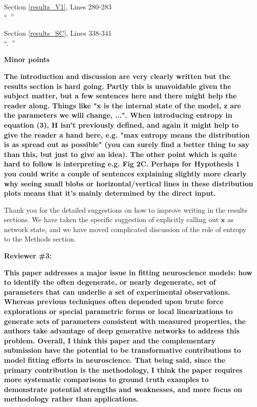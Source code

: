 \documentclass[11pt,a4paper]{article}
\begin{document}
\begin{displayquote}
Section \ref{results_V1}, Lines 280-283\\
``~''
\end{displayquote}

\begin{displayquote}
Section \ref{results_SC}, Lines 338-341\\
``.~''
\end{displayquote}
\textbf{Minor points }

\textbf{The introduction and discussion are very clearly written but the results section is hard going. Partly this is unavoidable given the subject matter, but a few sentences here and there might help the reader along. Things like "x is the internal state of the model, z are the parameters we will change, ...". When introducing entropy in equation (3), H isn't previously defined, and again it might help to give the reader a hand here, e.g. "max entropy means the distribution is as spread out as possible" (you can surely find a better thing to say than this, but just to give an idea). The other point which is quite hard to follow is interpreting e.g. Fig 2C. Perhaps for Hypothesis 1 you could write a couple of sentences explaining slightly more clearly why seeing small blobs or horizontal/vertical lines in these distribution plots means that it's mainly determined by the direct input. }

Thank you for the detailed suggestions on how to improve writing in the results sections.
 We have taken the specific suggestion of explicitly calling out $\mathbf{x}$ as network state, and we have moved complicated discussion of the role of entropy to the Methods section.

{\Large \textbf{Reviewer \#3:}}

\textbf{This paper addresses a major issue in fitting neuroscience models: how to identify the often degenerate, or nearly degenerate, set of parameters that can underlie a set of experimental observations. Whereas previous techniques often depended upon brute force explorations or special parametric forms or local linearizations to generate sets of parameters consistent with measured properties, the authors take advantage of deep generative networks to address this problem. Overall, I think this paper and the complementary submission have the potential to be transformative contributions to model fitting efforts in neuroscience. That being said, since the primary contribution is the methodology, I think the paper requires more systematic comparisons to ground truth examples to demonstrate potential strengths and weaknesses, and more focus on methodology rather than applications. }
\end{document}

